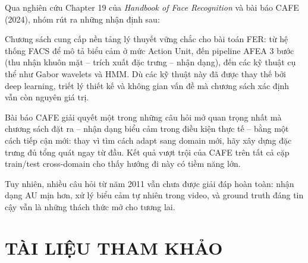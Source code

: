 \documentclass[12pt,a4paper]{article}
\begin{document}
Qua nghiên cứu Chapter 19 của \textit{Handbook of Face Recognition} và bài báo CAFE (2024), nhóm rút ra những nhận định sau:

Chương sách cung cấp nền tảng lý thuyết vững chắc cho bài toán FER: từ hệ thống FACS để mô tả biểu cảm ở mức Action Unit, đến pipeline AFEA 3 bước (thu nhận khuôn mặt -- trích xuất đặc trưng -- nhận dạng), đến các kỹ thuật cụ thể như Gabor wavelets và HMM. Dù các kỹ thuật này đã được thay thế bởi deep learning, triết lý thiết kế và không gian vấn đề mà chương sách xác định vẫn còn nguyên giá trị.

Bài báo CAFE giải quyết một trong những câu hỏi mở quan trọng nhất mà chương sách đặt ra -- nhận dạng biểu cảm trong điều kiện thực tế -- bằng một cách tiếp cận mới: thay vì tìm cách adapt sang domain mới, hãy xây dựng đặc trưng đủ tổng quát ngay từ đầu. Kết quả vượt trội của CAFE trên tất cả cặp train/test cross-domain cho thấy hướng đi này có tiềm năng lớn.

Tuy nhiên, nhiều câu hỏi từ năm 2011 vẫn chưa được giải đáp hoàn toàn: nhận dạng AU mịn hơn, xử lý biểu cảm tự nhiên trong video, và ground truth đáng tin cậy vẫn là những thách thức mở cho tương lai.


\newpage
\section*{TÀI LIỆU THAM KHẢO}
\end{document}
